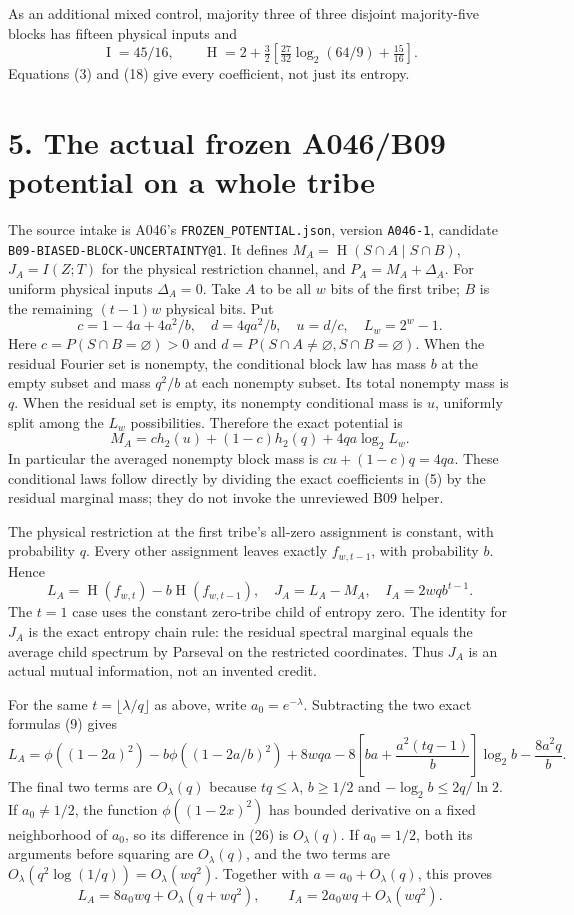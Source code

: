 \documentclass[11pt]{article}
\newcommand{\I}{\operatorname{I}}
\newcommand{\HH}{\operatorname{H}}
\begin{document}
As an additional mixed control, majority three of three disjoint
majority-five blocks has fifteen physical inputs and
\[
 \I=45/16,\qquad
 \HH=2+\tfrac32\left[\tfrac{27}{32}\log_2(64/9)+\tfrac{15}{16}\right].
                                                                    \tag{23}
\]
Equations (3) and (18) give every coefficient, not just its entropy.

\section*{5. The actual frozen A046/B09 potential on a whole tribe}
The source intake is A046's \texttt{FROZEN\_POTENTIAL.json}, version
\texttt{A046-1}, candidate \texttt{B09-BIASED-BLOCK-UNCERTAINTY@1}.
It defines $M_A=\HH(S\cap A\mid S\cap B)$,
$J_A=I(Z;T)$ for the physical restriction channel, and
$P_A=M_A+\Delta_A$. For uniform physical inputs $\Delta_A=0$.
Take $A$ to be all $w$ bits of the first tribe; $B$ is the remaining
$(t-1)w$ physical bits. Put
\[
 c=1-4a+4a^2/b,\quad d=4qa^2/b,\quad u=d/c,\quad L_w=2^w-1.
\]
Here $c=P(S\cap B=\varnothing)>0$ and
$d=P(S\cap A\ne\varnothing,S\cap B=\varnothing)$.
When the residual Fourier set is nonempty, the conditional block
law has mass $b$ at the empty subset and mass $q^2/b$ at each
nonempty subset. Its total nonempty mass is $q$. When the residual
set is empty, its nonempty conditional mass is $u$, uniformly split
among the $L_w$ possibilities. Therefore the exact potential is
\[
 \boxed{M_A=c h_2(u)+(1-c)h_2(q)+4qa\log_2 L_w.}             \tag{24}
\]
In particular the averaged nonempty block mass is
$cu+(1-c)q=4qa$. These conditional laws follow directly by dividing
the exact coefficients in (5) by the residual marginal mass;
they do not invoke the unreviewed B09 helper.

The physical restriction at the first tribe's all-zero assignment
is constant, with probability $q$. Every other assignment leaves
exactly $f_{w,t-1}$, with probability $b$. Hence
\[
 L_A=\HH(f_{w,t})-b\HH(f_{w,t-1}),\quad
 J_A=L_A-M_A,\quad I_A=2wq b^{t-1}.                          \tag{25}
\]
The $t=1$ case uses the constant zero-tribe child of entropy zero.
The identity for $J_A$ is the exact entropy chain rule: the residual
spectral marginal equals the average child spectrum by Parseval on
the restricted coordinates. Thus $J_A$ is an actual mutual
information, not an invented credit.

For the same $t=\lfloor\lambda/q\rfloor$ as above,
write $a_0=e^{-\lambda}$. Subtracting the two exact formulas (9)
gives
\[
 L_A=\phi((1-2a)^2)-b\phi((1-2a/b)^2)+8wqa
 -8\left[ba+\frac{a^2(tq-1)}b\right]\log_2 b-\frac{8a^2q}b.
                                                                    \tag{26}
\]
The final two terms are $O_\lambda(q)$ because $tq\le\lambda$,
$b\ge1/2$ and $-\log_2 b\le2q/\ln2$.
If $a_0\ne1/2$, the function $\phi((1-2x)^2)$ has bounded derivative
on a fixed neighborhood of $a_0$, so its difference in (26) is
$O_\lambda(q)$. If $a_0=1/2$, both its arguments before squaring
are $O_\lambda(q)$, and the two terms are
$O_\lambda(q^2\log(1/q))=O_\lambda(wq^2)$.
Together with $a=a_0+O_\lambda(q)$, this proves
\[
 L_A=8a_0wq+O_\lambda(q+wq^2),\qquad
 I_A=2a_0wq+O_\lambda(wq^2).                                \tag{27}
\]
\end{document}

